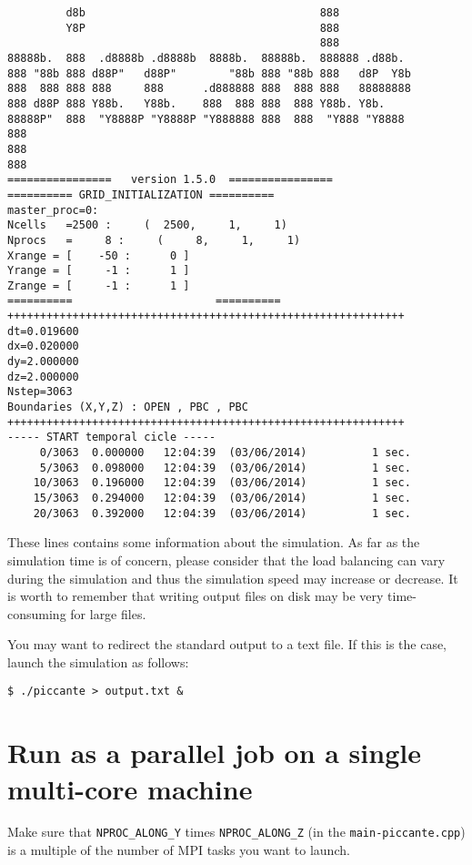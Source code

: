 \documentclass[11pt,a4paper]{report}
\begin{document}
\begin{verbatim}
         d8b                                    888                
         Y8P                                    888                
                                                888                
88888b.  888  .d8888b .d8888b  8888b.  88888b.  888888 .d88b.      
888 "88b 888 d88P"   d88P"        "88b 888 "88b 888   d8P  Y8b
888  888 888 888     888      .d888888 888  888 888   88888888     
888 d88P 888 Y88b.   Y88b.    888  888 888  888 Y88b. Y8b.         
88888P"  888  "Y8888P "Y8888P "Y888888 888  888  "Y888 "Y8888
888                                                                
888                                                                
888                                                                
================   version 1.5.0  ================
========== GRID_INITIALIZATION ==========
master_proc=0:
Ncells   =2500 :     (  2500,     1,     1)
Nprocs   =     8 :     (     8,     1,     1)
Xrange = [    -50 :      0 ]
Yrange = [     -1 :      1 ]
Zrange = [     -1 :      1 ]
==========                      ==========
+++++++++++++++++++++++++++++++++++++++++++++++++++++++++++++
dt=0.019600
dx=0.020000
dy=2.000000
dz=2.000000
Nstep=3063
Boundaries (X,Y,Z) : OPEN , PBC , PBC 
+++++++++++++++++++++++++++++++++++++++++++++++++++++++++++++
----- START temporal cicle -----
     0/3063  0.000000   12:04:39  (03/06/2014)          1 sec.
     5/3063  0.098000   12:04:39  (03/06/2014)          1 sec.
    10/3063  0.196000   12:04:39  (03/06/2014)          1 sec.
    15/3063  0.294000   12:04:39  (03/06/2014)          1 sec.
    20/3063  0.392000   12:04:39  (03/06/2014)          1 sec.
\end{verbatim}
These lines contains some information about the simulation. As far as the simulation time is of concern, please consider that the load balancing can vary during the simulation and thus the simulation speed may increase or decrease. It is worth to remember that writing output files on disk may be very time-consuming for large files.

You may want to redirect the standard output to a text file. If this is the case, launch the simulation as follows:
\begin{verbatim}
$ ./piccante > output.txt &
\end{verbatim}

\section{Run as a parallel job on a single multi-core machine}
Make sure that \verb+NPROC_ALONG_Y+ times  \verb+NPROC_ALONG_Z+ (in the \verb+main-piccante.cpp+) is a multiple of the number of MPI tasks you want to launch.
\end{document}
